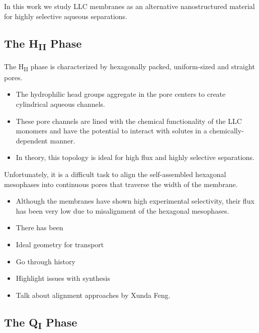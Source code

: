   
  In this work we study LLC membranes as an alternative nanostructured material for 
  highly selective aqueous separations.
  
  \subsection{The H\textsubscript{II} Phase}
   
  The H\textsubscript{II} phase is characterized by hexagonally packed, uniform-sized
  and straight pores.
  \begin{itemize}
    \item The hydrophilic head groups aggregate in the pore centers to create
    cylindrical aqueous channels. 
    \item These pore channels are lined with the chemical functionality of the LLC monomers
    and have the potential to interact with solutes in a chemically-dependent manner.
    \item In theory, this topology is ideal for high flux and highly selective separations.
  \end{itemize}
  
  Unfortunately, it is a difficult task to align the self-assembled hexagonal
  mesophases into continuous pores that traverse the width of the membrane.
  \begin{itemize}
    \item Although the membranes have shown high experimental selectivity, their 
    flux has been very low due to misalignment of the hexagonal mesophases.
    \item There has been 
  \end{itemize}
  
  
  \begin{itemize}
    \item Ideal geometry for transport
    \item Go through history
    \item Highlight issues with synthesis
    \item Talk about alignment approaches by Xunda Feng.
  \end{itemize}
  
  \subsection{The Q\textsubscript{I} Phase}
  
